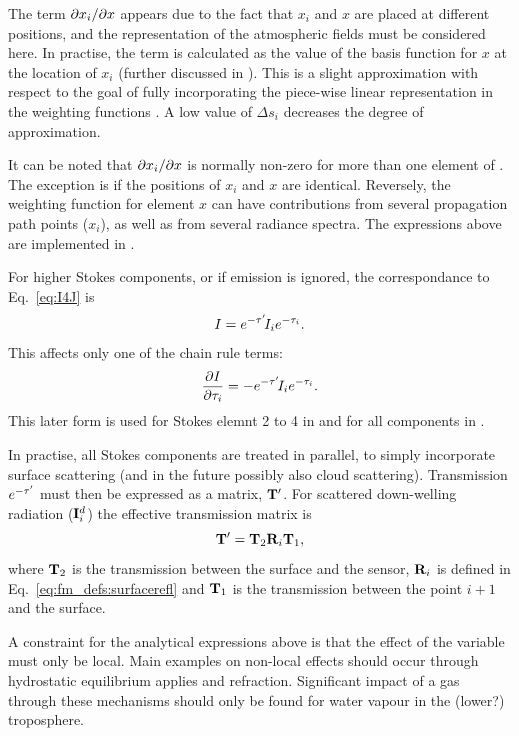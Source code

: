 The term $\partial x_i/\partial x$ appears due to the fact that $x_i$ and $x$ are
placed at different positions, and the representation of the atmospheric fields
must be considered here. In practise, the term is calculated as the value of
the basis function for $x$ at the location of $x_i$ (further discussed in
\citet{buehler:artst:05}). This is a slight approximation with respect to the
goal of fully incorporating the piece-wise linear representation in the
weighting functions \citep{buehler:artst:05}. A low value of $\Delta s_i$
decreases the degree of approximation.

It can be noted that $\partial x_i/\partial x$ is normally non-zero for more than
one element of \SttVct. The exception is if the positions of $x_i$ and $x$ are
identical. Reversely, the weighting function for element $x$ can have
contributions from several propagation path points ($x_i$), as well as from
several radiance spectra.
The expressions above are implemented in .

For higher Stokes components, or if emission is ignored, the correspondance to
Eq.~\ref{eq:I4J} is
\begin{equation}
  \label{eq:Q4J}
  I = e^{-\tau'}\!I_ie^{-\tau_{i}}.
\end{equation}
This affects only one of the chain rule terms:
\begin{equation}
  \frac{\partial I}{\partial \tau_{i}} 
      = -e^{-\tau'}\!I_i e^{-\tau_{i}}.
\end{equation}
This later form is used for Stokes elemnt 2 to 4 in
 and for all components in
.

In practise, all Stokes components are treated in parallel, to simply
incorporate surface scattering (and in the future possibly also cloud
scattering). Transmission $e^{-\tau'}$ must then be expressed as a matrix,
$\mathbf{T}'$. For scattered down-welling radiation (${\bf I}^d_i$) the
effective transmission matrix is
\begin{equation}
  \mathbf{T}' = \mathbf{T}_2\mathbf{R}_i\mathbf{T}_1,
\end{equation}
where $\mathbf{T}_2$ is the transmission between the surface and the sensor,
$\mathbf{R}_i$ is defined in Eq.~\ref{eq:fm_defs:surfacerefl} and
$\mathbf{T}_1$ is the transmission between the point $i+1$ and the surface.

A constraint for the analytical expressions above is that the effect of the
variable must only be local. Main examples on non-local effects should occur
through hydrostatic equilibrium applies and refraction. Significant impact of a
gas through these mechanisms should only be found for water vapour in the
(lower?) troposphere.





